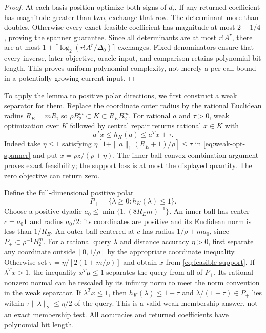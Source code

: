 \begin{proof}
At each basis position optimize both signs of $d_i$. If any returned
coefficient has magnitude greater than two, exchange that row. The
determinant more than doubles. Otherwise every exact feasible coefficient
has magnitude at most $2+1/4$, proving the spanner guarantee.
Since all determinants are at most $r!A^r$, there are at most
$1+\lceil\log_2(r!A^r/\Delta_0)\rceil$ exchanges. Fixed denominators
ensure that every inverse, later objective, oracle input, and comparison
retains polynomial bit length. This proves uniform polynomial complexity,
not merely a per-call bound in a potentially growing current input.
\end{proof}

To apply the lemma to positive polar directions, we first construct a
weak separator for them. Replace the coordinate outer radius by the rational
Euclidean radius $R_E=mR$, so
$\rho B_2^m\subset K\subset R_EB_2^m$.
For rational $a$ and $\tau>0$, weak optimization over $K$ followed by
central repair returns rational $x\in K$ with
\begin{equation}\label{eq:feasible-support}
 a^Tx\le h_K(a)\le a^Tx+\tau.
\end{equation}
Indeed take $\eta\le1$ satisfying
$\eta[1+\|a\|_1(R_E+1)/\rho]\le\tau$ in
\eqref{eq:weak-opt-spanner} and put $x=\rho z/(\rho+\eta)$.
The inner-ball convex-combination argument proves exact feasibility;
the support loss is at most the displayed quantity. The zero objective
can return zero.

Define the full-dimensional positive polar
\[
 P_+=\{\lambda\ge0:h_K(\lambda)\le1\}.
\]
Choose a positive dyadic $a_0\le\min\{1,(8R_Em)^{-1}\}$.
An inner ball has center $c=a_0\mathbf1$ and radius $a_0/2$:
its coordinates are positive and its Euclidean norm is less than
$1/R_E$. An outer ball centered at $c$ has radius
$1/\rho+ma_0$, since $P_+\subset\rho^{-1}B_2^m$.
For a rational query $\lambda$ and distance accuracy $\eta>0$, first
separate any coordinate outside $[0,1/\rho]$ by the appropriate
coordinate inequality. Otherwise set
$\tau=\eta/[2(1+m/\rho)]$ and obtain $x$ from
\eqref{eq:feasible-support}. If $\lambda^Tx>1$, the inequality
$x^T\mu\le1$ separates the query from all of $P_+$.
Its rational nonzero normal can be rescaled by its infinity norm to
meet the norm convention in the weak separator. If
$\lambda^Tx\le1$, then $h_K(\lambda)\le1+\tau$ and
$\lambda/(1+\tau)\in P_+$ lies within
$\tau\|\lambda\|_2\le\eta/2$ of the query.
This is a valid weak-membership answer, not an exact membership test.
All accuracies and returned coefficients have polynomial bit length.

